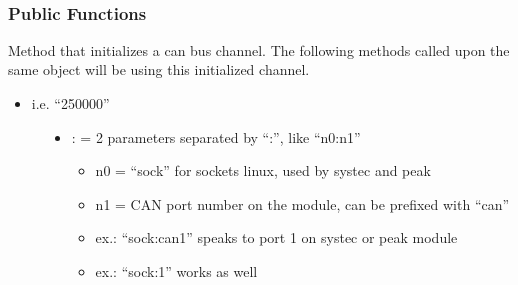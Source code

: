 \documentclass[a4paper,10pt,english]{sphinxmanual}
\begin{document}
\begin{fulllineitems}
\label{\detokenize{vendors/systec:_CPPv412CSockCanScan}}%
\pysigstartmultiline
{}%
\pysigstopmultiline~\subsubsection*{Public Functions}

\begin{fulllineitems}
\label{\detokenize{vendors/systec:_CPPv4N12CSockCanScan9createBusEK6string6string}}%
\pysigstartmultiline
{}%
\pysigstopmultiline
Method that initializes a can bus channel. The following methods called upon the same object will be using this initialized channel.

\begin{itemize}
\item {} 
i.e. “250000”

\end{itemize}
\begin{description}
\item[{}] \leavevmode\begin{itemize}
\item {} 
: = 2 parameters separated by “:”, like “n0:n1”\begin{itemize}
\item {} 
n0 = “sock” for sockets linux, used by systec and peak

\item {} 
n1 = CAN port number on the module, can be prefixed with “can”

\item {} 
ex.: “sock:can1” speaks to port 1 on systec or peak module

\item {} 
ex.: “sock:1” works as well


\end{itemize}
\end{itemize}
\end{description}
\end{fulllineitems}
\end{fulllineitems}
\end{document}
